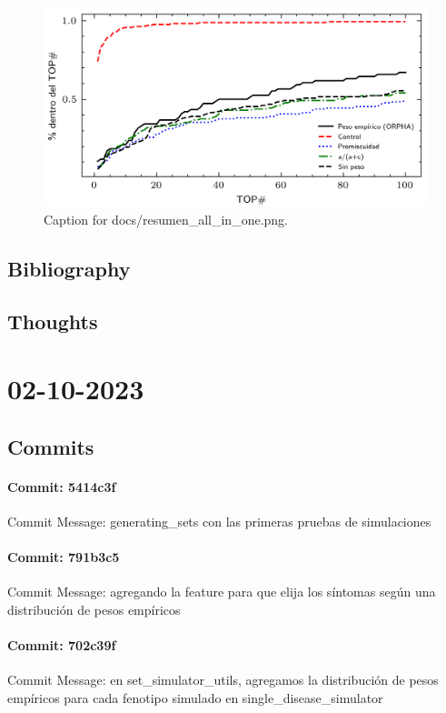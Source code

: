 \documentclass{article}
\begin{document}
\begin{figure}[h] \centering \includegraphics{docs/resumen_all_in_one.png} \caption{Caption for docs/resumen_all_in_one.png.} \end{figure}
\subsection{Bibliography}
\subsection{Thoughts}

\section{02-10-2023}
\subsection{Commits}
\paragraph{Commit: 5414c3f}
Commit Message: generating_sets con las primeras pruebas de simulaciones

\paragraph{Commit: 791b3c5}
Commit Message: agregando la feature para que elija los síntomas según una distribución de pesos empíricos

\paragraph{Commit: 702c39f}
Commit Message: en set_simulator_utils, agregamos la distribución de pesos empíricos para cada fenotipo simulado en single_disease_simulator
\end{document}
